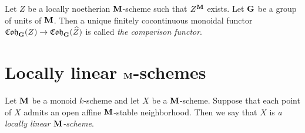 \begin{definition}
Let $Z$ be a locally noetherian $\mathbf{M}$-scheme such that $Z^{\mathbf{M}}$ exists. Let $\mathbf{G}$ be a group of units of $\mathbf{M}$. Then a unique finitely cocontinuous monoidal functor $\mathfrak{Coh}_{\mathbf{G}}(Z)\rightarrow \mathfrak{Coh}_{\mathbf{G}}(\widehat{Z})$ is called \textit{the comparison functor}.
\end{definition}

\section{Locally linear $\mathbf{M}$-schemes}

\begin{definition}
Let $\mathbf{M}$ be a monoid $k$-scheme and let $X$ be a $\mathbf{M}$-scheme. Suppose that each point of $X$ admits an open affine $\mathbf{M}$-stable neighborhood. Then we say that $X$ is \textit{a locally linear $\mathbf{M}$-scheme}.
\end{definition}

